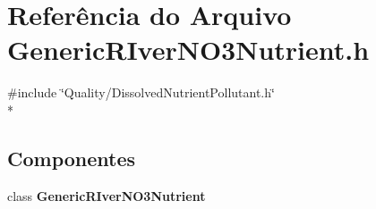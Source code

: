 \section{Referência do Arquivo Generic\+R\+Iver\+N\+O3\+Nutrient.\+h}
\label{_generic_r_iver_n_o3_nutrient_8h}
{\ttfamily \#include \char`\"{}Quality/\+Dissolved\+Nutrient\+Pollutant.\+h\char`\"{}}\\*
\subsection*{Componentes}
\begin{DoxyCompactItemize}
\item 
class {\bf Generic\+R\+Iver\+N\+O3\+Nutrient}
\end{DoxyCompactItemize}
